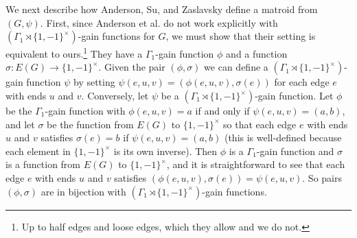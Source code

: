 \documentclass[12pt]{article}
\theoremstyle{definition}
\begin{document}
We next describe how Anderson, Su, and Zaslavsky define a matroid from $(G, \psi)$.
First, since Anderson et al. do not work explicitly with $(\Gamma_1 \rtimes \{1,-1\}^{\times})$-gain functions for $G$, we must show that their setting is equivalent to ours.\footnote{Up to half edges and loose edges, which they allow and we do not.}
They have a $\Gamma_1$-gain function $\phi$ and a function $\sigma\colon E(G) \to \{1,-1\}^{\times}$.
Given the pair $(\phi, \sigma)$ we can define a $(\Gamma_1 \rtimes \{1,-1\}^{\times})$-gain function $\psi$ by setting $\psi(e, u, v) = (\phi(e, u, v), \sigma(e))$ for each edge $e$ with ends $u$ and $v$.
Conversely, let $\psi$ be a $(\Gamma_1 \rtimes \{1,-1\}^{\times})$-gain function.
Let $\phi$ be the $\Gamma_1$-gain function with $\phi(e, u, v) = a$ if and only if $\psi(e, u, v) = (a, b)$, and let $\sigma$ be the function from $E(G)$ to $\{1,-1\}^{\times}$ so that each edge $e$ with ends $u$ and $v$ satisfies $\sigma(e) = b$ if $\psi(e, u, v) = (a, b)$ (this is well-defined because each element in $\{1,-1\}^{\times}$ is its own inverse).
Then $\phi$ is a $\Gamma_1$-gain function and $\sigma$ is a function from $E(G)$ to $\{1,-1\}^{\times}$, and it is straightforward to see that each edge $e$ with ends $u$ and $v$ satisfies $(\phi(e, u, v), \sigma(e)) = \psi(e, u, v)$.
So pairs $(\phi, \sigma)$ are in bijection with $(\Gamma_1 \rtimes \{1,-1\}^{\times})$-gain functions.
\end{document}
